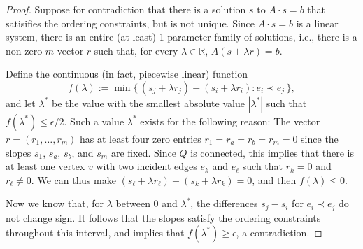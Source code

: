 \documentclass{patmorin}
\begin{document}
\begin{proof}
   Suppose for contradiction that there is a solution $s$ to $A\cdot s=b$ that satisifies the ordering
   constraints, %
   but is not unique.  Since $A\cdot s=b$ is a linear system, there is an entire (at least) 1-parameter family of solutions,
   i.e., there is a non-zero $m$-vector $r$ such that, for every
   $\lambda\in\mathbb R$, $A(s+\lambda r)=b$.


Define the continuous (in fact, piecewise linear) function
\begin{equation*}
  f(\lambda) := \min \{\, (s_j+\lambda r_j)-(s_i+\lambda r_i) : e_i \prec
  e_j\,\}
,
\end{equation*}
and let $\lambda^*$ be the value with the smallest absolute value
 $|\lambda^*|$ such that
 $f(\lambda^*)\le\epsilon/2$.
Such a value $\lambda^*$ exists for the following reason:
   The vector $r=(r_1,\ldots,r_m)$ has at least four zero entries
   $r_1=r_a=r_b=r_m=0$ since the slopes $s_1$, $s_a$, $s_b$, and $s_m$
   are fixed.
  Since $Q$ is connected, this implies
   that there is at least one vertex $v$ with two incident edges $e_k$
   and $e_\ell$ such that $r_k=0$ and $r_\ell\neq 0$. 
   We can thus make $(s_\ell+\lambda r_\ell)-(s_k+\lambda r_k)=0$,
and then $f(\lambda)\le0$.

Now we know that, for $\lambda$ between $0$ and $\lambda^*$,
the differences $s_j-s_i$ for $e_i\prec e_j$ do not change sign.
It follows that the slopes satisfy the ordering constraints throughout
this interval, and
    implies that $f(\lambda^*)\ge\epsilon$, a contradiction.
%
%
%
\end{proof}
\end{document}
